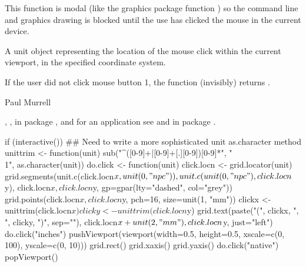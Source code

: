 %
\begin{Details}\relax
This function is modal (like the graphics package
function ) so
the command line and graphics drawing is blocked until
the use has clicked the mouse  in the current device.
\end{Details}
%
\begin{Value}
A unit object representing the location of the mouse click within the
current viewport, in the specified coordinate system.

If the user did not click mouse button 1, the function
(invisibly) returns .
\end{Value}
%
\begin{Author}\relax
 Paul Murrell 
\end{Author}
%
\begin{SeeAlso}\relax
 , ,
 in package , and for an application
see  and
 in package .
\end{SeeAlso}
%
\begin{Examples}
\begin{ExampleCode}
if (interactive()) {
  ## Need to write a more sophisticated unit as.character method
  unittrim <- function(unit) {
    sub("^([0-9]+|[0-9]+[.][0-9])[0-9]*", "\\1", as.character(unit))
  }
  do.click <- function(unit) {
    click.locn <- grid.locator(unit)
    grid.segments(unit.c(click.locn$x, unit(0, "npc")),
                  unit.c(unit(0, "npc"), click.locn$y),
                  click.locn$x, click.locn$y,
                  gp=gpar(lty="dashed", col="grey"))
    grid.points(click.locn$x, click.locn$y, pch=16, size=unit(1, "mm"))
    clickx <- unittrim(click.locn$x)
    clicky <- unittrim(click.locn$y)
    grid.text(paste("(", clickx, ", ", clicky, ")", sep=""),
              click.locn$x + unit(2, "mm"), click.locn$y,
              just="left")
  }
  do.click("inches")
  pushViewport(viewport(width=0.5, height=0.5,
                         xscale=c(0, 100), yscale=c(0, 10)))
  grid.rect()
  grid.xaxis()
  grid.yaxis()
  do.click("native")
  popViewport()  
}
\end{ExampleCode}
\end{Examples}
